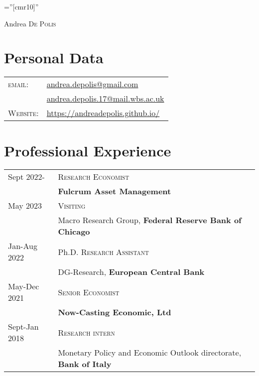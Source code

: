 \documentclass[a4paper,12pt]{article}
\begin{document}
\font\fb=''[cmr10]''

\par{\centering
		{\Huge Andrea \textsc{De Polis}
	}\par}

\section{Personal Data}
\renewcommand{\arraystretch}{0.75}
\begin{tabular}{ll}
        \textsc{email:}     & \href{mailto:andrea.depolis@gmail.com}{andrea.depolis@gmail.com}\\
                        & \href{mailto:andrea.depolis.17@mail.wbs.ac.uk}{andrea.depolis.17@mail.wbs.ac.uk} \\
    \textsc{Website:}   & \url{https://andreadepolis.github.io/}            
                        
\end{tabular}

\section{Professional Experience}
\begin{tabular}{ll}
Sept 2022-& \textsc{Research Economist}\\
& \textbf{Fulcrum Asset Management}\\[1em]
May 2023 & \textsc{Visiting}\\
& Macro Research Group, \textbf{Federal Reserve Bank of Chicago}\\[1em]
Jan-Aug 2022 & Ph.D. \textsc{Research Assistant}\\
&DG-Research, \textbf{European Central Bank}\\[1em]
May-Dec 2021 & \textsc{Senior Economist}\\
&\textbf{Now-Casting Economic, Ltd}\\[1em]
Sept-Jan 2018 & \textsc{Research intern} \\
&Monetary Policy and Economic Outlook directorate, \textbf{Bank of Italy}
\end{tabular}
\end{document}
